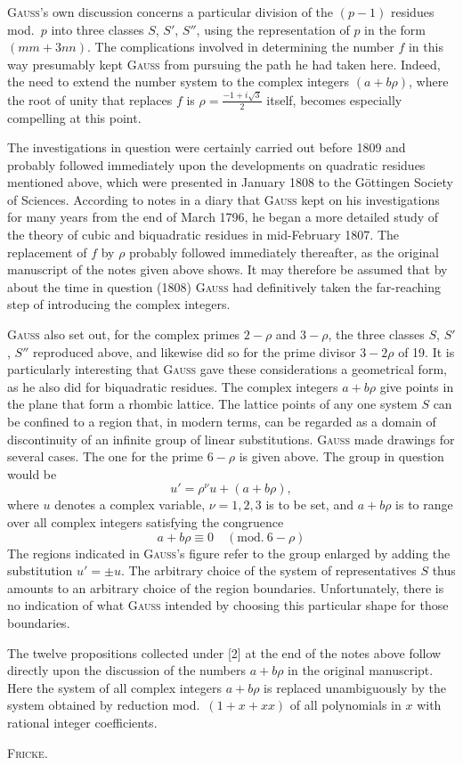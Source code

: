 \textsc{Gauss}'s own discussion concerns a particular division of the
$(p-1)$ residues mod.\ $p$ into three classes $S$, $S'$, $S''$, using the
representation of $p$ in the form $(mm+3nn)$. The complications involved in
determining the number $f$ in this way presumably kept \textsc{Gauss} from pursuing
the path he had taken here. Indeed, the need to extend the number system to the complex
integers $(a+b\rho)$, where the root of unity that replaces $f$ is
$\rho = \frac{-1+i\sqrt{3}}{2}$ itself, becomes especially compelling at this point.

The investigations in question were certainly carried out before 1809 and
probably followed immediately upon the developments on quadratic residues
mentioned above, which were presented in January 1808 to the Göttingen Society
of Sciences. According to notes in a diary that \textsc{Gauss} kept on his investigations
for many years from the end of March 1796, he began a more detailed study of the theory of cubic
and biquadratic residues in mid-February 1807. The replacement of $f$ by
$\rho$ probably followed immediately thereafter, as the original manuscript of the
notes given above shows. It may therefore be assumed that by about the time in
question (1808) \textsc{Gauss} had definitively taken the far-reaching step of
introducing the complex integers.

\textsc{Gauss} also set out, for the complex primes $2-\rho$ and $3-\rho$, the three classes
$S$, $S'$, $S''$ reproduced above, and likewise did so for the prime divisor
$3-2\rho$ of 19. It is particularly interesting that \textsc{Gauss} gave these considerations
a geometrical form, as he also did for biquadratic residues. The complex integers
$a+b\rho$ give points in the plane that form a rhombic lattice. The lattice points
of any one system $S$ can be confined to a region that, in modern terms, can
be regarded as a domain of discontinuity of an infinite group of linear
substitutions. \textsc{Gauss} made drawings for several cases. The one for the
prime $6-\rho$ is given above. The group in question would be
\[
u' = \rho^{\nu} u + (a+b\rho),
\]
where $u$ denotes a complex variable, $\nu = 1, 2, 3$ is to be set, and $a+b\rho$ is to
range over all complex integers satisfying the congruence
\[
a+b\rho \equiv 0 \quad(\mathrm{mod.}\ 6-\rho)
\]
The regions indicated in \textsc{Gauss}'s figure refer to the group enlarged by adding
the substitution $u' = \pm u$. The arbitrary choice of the system of representatives
$S$ thus amounts to an arbitrary choice of the region boundaries.
Unfortunately, there is no indication of what \textsc{Gauss} intended by choosing
this particular shape for those boundaries.

The twelve propositions collected under [2] at the end of the notes above
follow directly upon the discussion of the numbers $a+b\rho$ in the original
manuscript. Here the system of all complex integers $a+b\rho$ is replaced
unambiguously by the system obtained by reduction mod.\ $(1+x+xx)$ of all
polynomials in $x$ with rational integer coefficients.
\par\nobreak\noindent\hfill\textsc{Fricke}.\par
\endgroup
